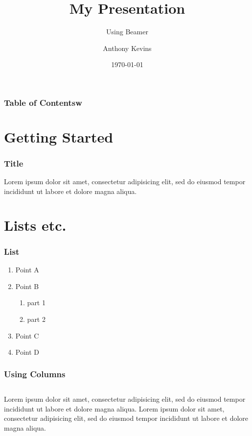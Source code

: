 \documentclass[14pt]{beamer}
\title{My Presentation}
\subtitle{Using Beamer}
\author{Anthony Kevins}
\institute{School of Governance\\
	Utrecht University}
\date{\today}
\begin{document}
\begin{frame}
\titlepage
\end{frame}

\begin{frame}
\frametitle{Table of Contentsw}

\tableofcontents
\end{frame}


\section{Getting Started}

\begin{frame}
\frametitle{Title}
Lorem ipsum dolor sit amet, consectetur adipisicing elit, sed do eiusmod tempor incididunt ut labore et dolore magna aliqua.
\end{frame}


\section{Lists etc.}

\begin{frame}
\frametitle{List}
\begin{enumerate}[I]
	\item Point A
	\item Point B
	\begin{enumerate}[i]
		\item part 1
		\item part 2
	\end{enumerate}
	\item Point C
	\item Point D
\end{enumerate}
\end{frame}


\begin{frame}
\frametitle{Using Columns}
\begin{columns}
	Lorem ipsum dolor sit amet, consectetur adipisicing elit, sed do eiusmod tempor incididunt ut labore et dolore magna aliqua.
	Lorem ipsum dolor sit amet, consectetur adipisicing elit, sed do eiusmod tempor incididunt ut labore et dolore magna aliqua.
\end{columns}
\end{frame}
\end{document}
